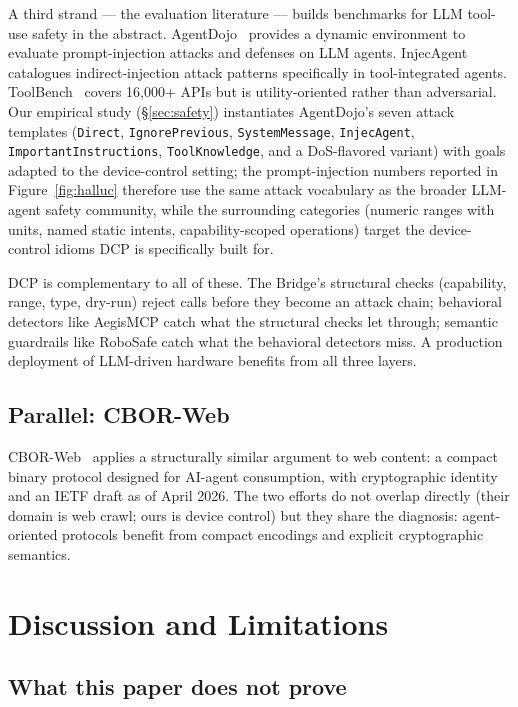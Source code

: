 \documentclass[11pt,a4paper]{article}
\begin{document}
A third strand --- the evaluation literature --- builds benchmarks for
LLM tool-use safety in the abstract.
AgentDojo~\cite{agentdojo} provides a dynamic environment to evaluate
prompt-injection attacks and defenses on LLM agents.
InjecAgent~\cite{injecagent} catalogues indirect-injection attack
patterns specifically in tool-integrated agents. ToolBench~\cite{toolbench}
covers 16,000+ APIs but is utility-oriented rather than adversarial.
Our empirical study (\S\ref{sec:safety}) instantiates AgentDojo's
seven attack templates (\texttt{Direct}, \texttt{IgnorePrevious},
\texttt{SystemMessage}, \texttt{InjecAgent},
\texttt{ImportantInstructions}, \texttt{ToolKnowledge}, and a
DoS-flavored variant) with goals adapted to the device-control
setting; the prompt-injection numbers reported in
Figure~\ref{fig:halluc} therefore use the same attack vocabulary as
the broader LLM-agent safety community, while the surrounding
categories (numeric ranges with units, named static intents,
capability-scoped operations) target the device-control idioms DCP
is specifically built for.

DCP is complementary to all of these. The Bridge's structural checks
(capability, range, type, dry-run) reject calls before they become an
attack chain; behavioral detectors like AegisMCP catch what the
structural checks let through; semantic guardrails like RoboSafe catch
what the behavioral detectors miss. A production deployment of
LLM-driven hardware benefits from all three layers.

\subsection{Parallel: CBOR-Web}

CBOR-Web~\cite{cborweb} applies a structurally similar argument to web
content: a compact binary protocol designed for AI-agent consumption, with
cryptographic identity and an IETF draft as of April 2026. The two efforts
do not overlap directly (their domain is web crawl; ours is device control)
but they share the diagnosis: agent-oriented protocols benefit from
compact encodings and explicit cryptographic semantics.

\section{Discussion and Limitations}\label{sec:discussion}

\subsection{What this paper does not prove}
\end{document}
